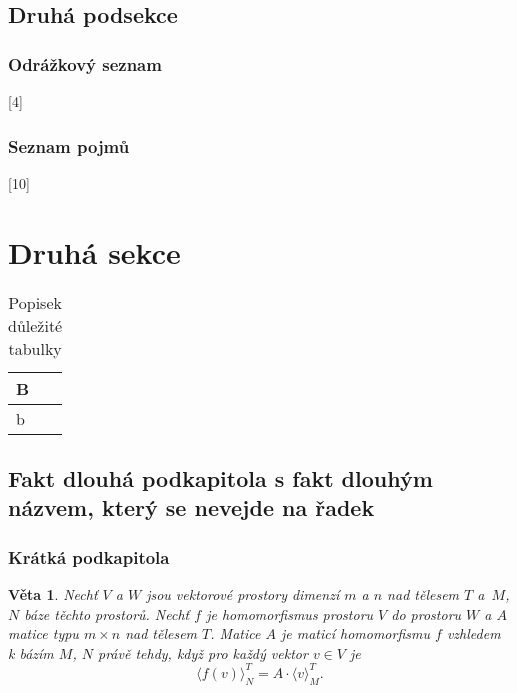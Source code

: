 \documentclass{article}
\theoremstyle{plain}
\newtheorem{veta}{Věta}
\begin{document}
\subsection{Druhá podsekce}
\blindtext[3]

\subsubsection{Odrážkový seznam}\label{subsubsec:odrazky}
[4]

\subsubsection{Seznam pojmů}\label{subsubsec:pojmy}
[10]

\section{Druhá sekce}
\blindtext[5]

\begin{table}
\centering
\caption{Popisek důležité tabulky}\label{tab:dulezita}
\begin{tabular}{|l|}
\hline
B \\
\hline
b \\
\hline
\end{tabular}
\end{table}

\subsection[Fakt delší nadpis]{Fakt dlouhá podkapitola s fakt dlouhým názvem, který se nevejde na řadek}
\blindtext[20]

\subsubsection{Krátká podkapitola}
\blindtext

\begin{veta}\label{thm:jedina}
Nechť $V$ a $W$ jsou vektorové prostory dimenzí $m$ a $n$ nad tělesem $T$ a~$M$, $N$ báze  těchto prostorů. Nechť $f$ je homomorfismus prostoru $V$ do prostoru $W$ a $A$ matice typu $m\times n$ nad tělesem $T$. Matice $A$ je maticí homomorfismu $f$ vzhledem k bázím $M$, $N$ právě tehdy, když pro každý vektor $v \in V$ je 
\begin{equation}
\langle f(v)\rangle^T_N  = A \cdot \langle v\rangle^T_M.\label{eqn:prvni}
\end{equation} 
\end{veta}
\end{document}
